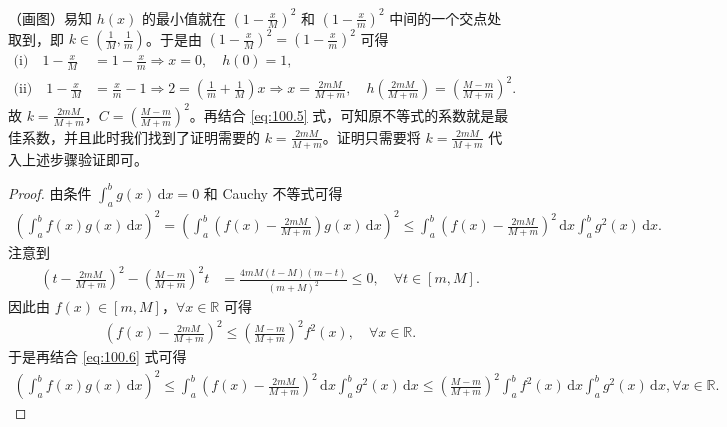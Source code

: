 \documentclass[../../main.tex]{subfiles}%
\begin{document}
\begin{remark}
（画图）易知 \(h(x)\) 的最小值就在 \(\left( 1 - \frac{x}{M} \right)^2\) 和 \(\left( 1 - \frac{x}{m} \right)^2\) 中间的一个交点处取到，即 \(k \in \left( \frac{1}{M}, \frac{1}{m} \right)\)。于是由 \(\left( 1 - \frac{x}{M} \right)^2 = \left( 1 - \frac{x}{m} \right)^2\) 可得
\begin{align*}
\text{(i)} \quad 1 - \frac{x}{M} &= 1 - \frac{x}{m} \Longrightarrow x = 0, \quad h(0) = 1, \\
\text{(ii)} \quad 1 - \frac{x}{M} &= \frac{x}{m} - 1 \Longrightarrow 2 = \left( \frac{1}{m} + \frac{1}{M} \right) x \Longrightarrow x = \frac{2mM}{M + m}, \quad h\left( \frac{2mM}{M + m} \right) = \left( \frac{M - m}{M + m} \right)^2.
\end{align*}
故 \(k = \frac{2mM}{M + m}\)，\(C = \left( \frac{M - m}{M + m} \right)^2\)。再结合 \eqref{eq:100.5} 式，可知原不等式的系数就是最佳系数，并且此时我们找到了证明需要的 \(k = \frac{2mM}{M + m}\)。证明只需要将 \(k = \frac{2mM}{M + m}\) 代入上述步骤验证即可。
\end{remark}
\begin{proof}

由条件 \(\int_a^b g(x) \, \mathrm{d}x = 0\) 和 Cauchy 不等式可得
\begin{align}
\left( \int_a^b f(x) g(x) \, \mathrm{d}x \right)^2 = \left( \int_a^b \left( f(x) - \frac{2mM}{M + m} \right) g(x) \, \mathrm{d}x \right)^2 
\leqslant \int_a^b \left( f(x) - \frac{2mM}{M + m} \right)^2 \, \mathrm{d}x \int_a^b g^2(x) \, \mathrm{d}x. \label{eq:100.6}
\end{align}
注意到
\begin{align*}
\left( t - \frac{2mM}{M + m} \right)^2 - \left( \frac{M - m}{M + m} \right)^2 t &= \frac{4mM \left( t - M \right) \left( m - t \right)}{\left( m + M \right)^2} \leqslant 0, \quad \forall t \in [m, M].
\end{align*}
因此由 \(f(x) \in [m, M]\)，\(\forall x \in \mathbb{R}\) 可得
\begin{align*}
\left( f(x) - \frac{2mM}{M + m} \right)^2 \leqslant \left( \frac{M - m}{M + m} \right)^2 f^2(x), \quad \forall x \in \mathbb{R}.
\end{align*}
于是再结合 \eqref{eq:100.6} 式可得
\begin{align*}
\left( \int_a^b f(x) g(x) \, \mathrm{d}x \right)^2 \leqslant \int_a^b \left( f(x) - \frac{2mM}{M + m} \right)^2 \, \mathrm{d}x \int_a^b g^2(x) \, \mathrm{d}x 
\leqslant \left( \frac{M - m}{M + m} \right)^2 \int_a^b f^2(x) \, \mathrm{d}x \int_a^b g^2(x) \, \mathrm{d}x, \forall x \in \mathbb{R}.
\end{align*}

\end{proof}
\end{document}
